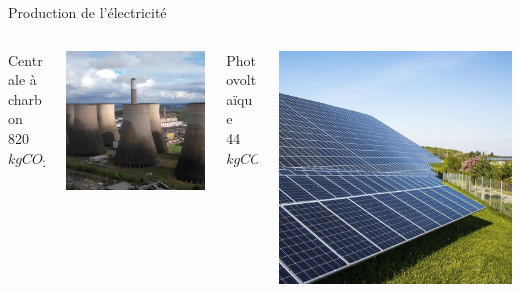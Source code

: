 \documentclass{beamer}
\begin{document}
\begin{frame}{Production de l'électricité}
\begin{columns}
  \begin{column}{0.26\textwidth}
Centrale à charbon\\
820 $kgCO_2/MWh$
\end{column}
\begin{column}{0.2\textwidth}
  \includegraphics[scale=0.15]{images/centrale_charbon.png}
\end{column}
\begin{column}{0.25\textwidth}
Photovoltaïque\\
44 $kgCO_2/MWh$
\end{column}
\begin{column}{0.2\textwidth}
  \includegraphics[scale=0.1]{images/PV.jpeg}

\end{column}
\end{columns}
\end{frame}
\end{document}
